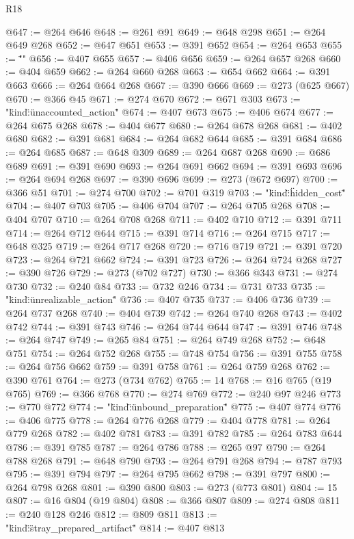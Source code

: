 \begin{lexlean}{R18}
\begin{coremodule}
{{{{{{{{{{@647 := @264 @646
@648 := @261 @91
@649 := @648 @298
@651 := @264 @649 @268
@652 := @647 @651
@653 := @391 @652
@654 := @264 @653
@655 := "\"}"
@656 := @407 @655
@657 := @406 @656
@659 := @264 @657 @268
@660 := @404 @659
@662 := @264 @660 @268
@663 := @654 @662
@664 := @391 @663
@666 := @264 @664 @268
@667 := @390 @666
@669 := @273 (@625 @667)
@670 := @366 @45
@671 := @274 @670
@672 := @671 @303
@673 := "{\"kind\":\"unaccounted_action\""
@674 := @407 @673
@675 := @406 @674
@677 := @264 @675 @268
@678 := @404 @677
@680 := @264 @678 @268
@681 := @402 @680
@682 := @391 @681
@684 := @264 @682 @644
@685 := @391 @684
@686 := @264 @685
@687 := @648 @309
@689 := @264 @687 @268
@690 := @686 @689
@691 := @391 @690
@693 := @264 @691 @662
@694 := @391 @693
@696 := @264 @694 @268
@697 := @390 @696
@699 := @273 (@672 @697)
@700 := @366 @51
@701 := @274 @700
@702 := @701 @319
@703 := "{\"kind\":\"hidden_cost\""
@704 := @407 @703
@705 := @406 @704
@707 := @264 @705 @268
@708 := @404 @707
@710 := @264 @708 @268
@711 := @402 @710
@712 := @391 @711
@714 := @264 @712 @644
@715 := @391 @714
@716 := @264 @715
@717 := @648 @325
@719 := @264 @717 @268
@720 := @716 @719
@721 := @391 @720
@723 := @264 @721 @662
@724 := @391 @723
@726 := @264 @724 @268
@727 := @390 @726
@729 := @273 (@702 @727)
@730 := @366 @343
@731 := @274 @730
@732 := @240 @84
@733 := @732 @246
@734 := @731 @733
@735 := "{\"kind\":\"unrealizable_action\""
@736 := @407 @735
@737 := @406 @736
@739 := @264 @737 @268
@740 := @404 @739
@742 := @264 @740 @268
@743 := @402 @742
@744 := @391 @743
@746 := @264 @744 @644
@747 := @391 @746
@748 := @264 @747
@749 := @265 @84
@751 := @264 @749 @268
@752 := @648 @751
@754 := @264 @752 @268
@755 := @748 @754
@756 := @391 @755
@758 := @264 @756 @662
@759 := @391 @758
@761 := @264 @759 @268
@762 := @390 @761
@764 := @273 (@734 @762)
@765 := 14
@768 := @16 @765 (@19 @765)
@769 := @366 @768
@770 := @274 @769
@772 := @240 @97 @246
@773 := @770 @772
@774 := "{\"kind\":\"unbound_preparation\""
@775 := @407 @774
@776 := @406 @775
@778 := @264 @776 @268
@779 := @404 @778
@781 := @264 @779 @268
@782 := @402 @781
@783 := @391 @782
@785 := @264 @783 @644
@786 := @391 @785
@787 := @264 @786
@788 := @265 @97
@790 := @264 @788 @268
@791 := @648 @790
@793 := @264 @791 @268
@794 := @787 @793
@795 := @391 @794
@797 := @264 @795 @662
@798 := @391 @797
@800 := @264 @798 @268
@801 := @390 @800
@803 := @273 (@773 @801)
@804 := 15
@807 := @16 @804 (@19 @804)
@808 := @366 @807
@809 := @274 @808
@811 := @240 @128 @246
@812 := @809 @811
@813 := "{\"kind\":\"stray_prepared_artifact\""
@814 := @407 @813
}}}}}}}}}}}}}}
\end{coremodule}
\end{lexlean}

